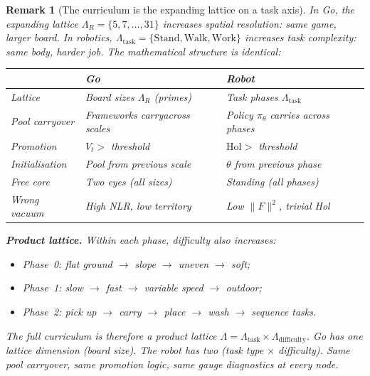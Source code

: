 \documentclass[11pt,a4paper]{article}
\newtheorem{remark}[theorem]{Remark}
\newcommand{\norm}[1]{\lVert #1 \rVert}
\begin{document}
\begin{remark}[The curriculum is the expanding lattice
  on a task axis]%
\label{rem:curriculum-lattice}
\color{black!60}%
In Go, the expanding lattice
$\Lambda_R = \{5, 7, \ldots, 31\}$
increases \emph{spatial resolution}:
same game, larger board.
In robotics, $\Lambda_{\mathrm{task}}
= \{\mathrm{Stand}, \mathrm{Walk}, \mathrm{Work}\}$
increases \emph{task complexity}:
same body, harder job.
The mathematical structure is identical:

\medskip
\begin{center}
\small
\begin{tabular}{@{}lll@{}}
\toprule
& \textbf{Go} & \textbf{Robot} \\
\midrule
Lattice
  & Board sizes $\Lambda_R$ (primes)
  & Task phases $\Lambda_{\mathrm{task}}$ \\
Pool carryover
  & Frameworks carry\newline across scales
  & Policy $\pi_\theta$ carries\newline
    across phases \\
Promotion
  & $V_t > $ threshold
  & $\mathrm{Hol} > $ threshold \\
Initialisation
  & Pool from previous scale
  & $\theta$ from previous phase \\
Free core
  & Two eyes (all sizes)
  & Standing (all phases) \\
Wrong vacuum
  & High NLR, low territory
  & Low $\norm{F}^2$, trivial Hol \\
\bottomrule
\end{tabular}
\end{center}

\medskip\noindent
\textbf{Product lattice.}\;
Within each phase, difficulty also increases:
\begin{itemize}[nosep]
\item Phase~0: flat ground
  $\to$ slope $\to$ uneven $\to$ soft;
\item Phase~1: slow
  $\to$ fast $\to$ variable speed
  $\to$ outdoor;
\item Phase~2: pick up
  $\to$ carry $\to$ place
  $\to$ wash $\to$ sequence tasks.
\end{itemize}
The full curriculum is therefore a
\emph{product lattice}
$\Lambda = \Lambda_{\mathrm{task}}
  \times \Lambda_{\mathrm{difficulty}}$.
Go has one lattice dimension (board size).
The robot has two (task type $\times$ difficulty).
Same pool carryover, same promotion logic,
same gauge diagnostics at every node.


\end{remark}
\end{document}
